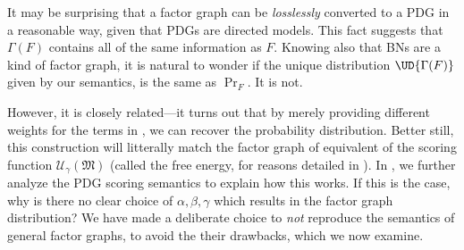 \documentclass{article}
\theoremstyle{plain}
\newtheorem{coro}{Corollary}[theorem]
\theoremstyle{definition}
\theoremstyle{remark}
\DeclarePairedDelimiter{\bbr}{\llbracket}{\rrbracket}
\newcommand{\dg}[1]{\mathfrak{#1}}
\newcommand\PDGof{\Gamma}
\numberwithin{equation}{section}
\begin{document}

	It may be surprising that a factor graph can be \emph{losslessly} converted to a PDG in a reasonable way, given that PDGs are directed models.
	This fact suggests that $\PDGof(F)$ contains all of the same information as $F$. Knowing also that BNs are a kind of factor graph, it is natural to wonder if the unique distribution $\UD{\PDGof(F)}$ given by our semantics, is the same as $\Pr_F$.		
		It is not. 


		
	However, it is closely related---it turns out that by merely providing different weights for the terms in , we can recover the probability distribution. Better still, this construction will litterally match the factor graph of equivalent of the scoring function $\mathcal U_\gamma(\dg M)$ (called the free energy, for reasons detailed in ).
		In , we further analyze the PDG scoring semantics to explain how this works.
		If this is the case, why is there no clear choice of $\alpha,\beta,\gamma$ which results in the factor graph distribution?  
		We have made a deliberate choice to \emph{not} reproduce the semantics of general factor graphs, to avoid the their drawbacks, which 
		we now examine.

\end{document}
